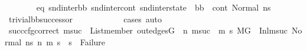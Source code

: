 \begin{isabellebody}
\isanewline
\ \ \ \ \ \ \isamarkupfalse%
\ eq{\isacharcolon}{\kern0pt}\ {\isachardoublequoteopen}{\isacharparenleft}{\kern0pt}snd{\isacharunderscore}{\kern0pt}inter{\isacharunderscore}{\kern0pt}bb{\isacharcomma}{\kern0pt}\ snd{\isacharunderscore}{\kern0pt}inter{\isacharunderscore}{\kern0pt}cont{\isacharcomma}{\kern0pt}\ snd{\isacharunderscore}{\kern0pt}inter{\isacharunderscore}{\kern0pt}state{\isacharparenright}{\kern0pt}\ {\isacharequal}{\kern0pt}\ {\isacharparenleft}{\kern0pt}bb{}{\isacharcomma}{\kern0pt}\ \ cont{}{\isacharcomma}{\kern0pt}\ {\isacharparenleft}{\kern0pt}Normal\ ns{}{\isacharparenright}{\kern0pt}{\isacharparenright}{\kern0pt}{\isachardoublequoteclose}\ \isamarkupfalse%
\ trivial{\isacharunderscore}{\kern0pt}bb{\isacharunderscore}{\kern0pt}successor\ {}\ \isanewline
\ \ \ \ \ \ \ \ \isamarkupfalse%
\ {\isacharparenleft}{\kern0pt}cases{\isacharparenright}{\kern0pt}\ auto\ \isanewline
\isanewline
\ \ \ \ \ \ \isamarkupfalse%
\ succ{\isacharunderscore}{\kern0pt}cfg{\isacharunderscore}{\kern0pt}correct{\isacharcolon}{\kern0pt}\ {\isachardoublequoteopen}{\isacharparenleft}{\kern0pt}{\isasymforall}msuc{}{\isachardot}{\kern0pt}\ \ List{\isachardot}{\kern0pt}member\ {\isacharparenleft}{\kern0pt}out{\isacharunderscore}{\kern0pt}edges{\isacharparenleft}{\kern0pt}G{\isacharparenright}{\kern0pt}\ {\isacharbang}{\kern0pt}\ n{\isacharparenright}{\kern0pt}\ msuc{}\ {\isasymlongrightarrow}\ {\isacharparenleft}{\kern0pt}{\isasymforall}m{}\ s{}{\isachardot}{\kern0pt}\ {\isacharparenleft}{\kern0pt}{\isacharparenleft}{\kern0pt}M{\isacharcomma}{\kern0pt}{\isasymLambda}{\isacharcomma}{\kern0pt}{\isasymGamma}{\isacharcomma}{\kern0pt}{\isasymOmega}{\isacharcomma}{\kern0pt}G\ {\isasymturnstile}\ {\isacharparenleft}{\kern0pt}Inl{\isacharparenleft}{\kern0pt}msuc{}{\isacharparenright}{\kern0pt}{\isacharcomma}{\kern0pt}\ {\isacharparenleft}{\kern0pt}Normal\ ns{}{\isacharparenright}{\kern0pt}{\isacharparenright}{\kern0pt}\ {\isacharminus}{\kern0pt}n{\isasymrightarrow}{\isacharasterisk}{\kern0pt}\ {\isacharparenleft}{\kern0pt}m{}{\isacharcomma}{\kern0pt}\ s{}{\isacharparenright}{\kern0pt}{\isacharparenright}{\kern0pt}\ {\isasymlongrightarrow}\ s{}\ {\isasymnoteq}\ Failure{\isacharparenright}{\kern0pt}{\isacharparenright}{\kern0pt}{\isacharparenright}{\kern0pt}{\isachardoublequoteclose}\isanewline
\ \ \ \ \ \ \ \ \isamarkupfalse%

\end{isabellebody}
